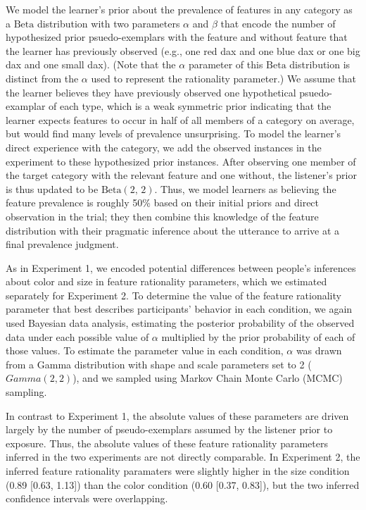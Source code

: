 \documentclass[
  english,
  man,floatsintext]{apa6}
\begin{document}
We model the learner's prior about the prevalence of features in any category as a \(\text{Beta}\) distribution with two parameters \(\alpha\) and \(\beta\) that encode the number of hypothesized prior psuedo-exemplars with the feature and without feature that the learner has previously observed (e.g., one red dax and one blue dax or one big dax and one small dax). (Note that the \(\alpha\) parameter of this \(\text{Beta}\) distribution is distinct from the \(\alpha\) used to represent the rationality parameter.) We assume that the learner believes they have previously observed one hypothetical psuedo-examplar of each type, which is a weak symmetric prior indicating that the learner expects features to occur in half of all members of a category on average, but would find many levels of prevalence unsurprising. To model the learner's direct experience with the category, we add the observed instances in the experiment to these hypothesized prior instances. After observing one member of the target category with the relevant feature and one without, the listener's prior is thus updated to be \(\text{Beta}\left(2,\,2\right)\). Thus, we model learners as believing the feature prevalence is roughly 50\% based on their initial priors and direct observation in the trial; they then combine this knowledge of the feature distribution with their pragmatic inference about the utterance to arrive at a final prevalence judgment.

As in Experiment 1, we encoded potential differences between people's inferences about color and size in feature rationality parameters, which we estimated separately for Experiment 2. To determine the value of the feature rationality parameter that best describes participants' behavior in each condition, we again used Bayesian data analysis, estimating the posterior probability of the observed data under each possible value of \(\alpha\) multiplied by the prior probability of each of those values. To estimate the parameter value in each condition, \(\alpha\) was drawn from a Gamma distribution with shape and scale parameters set to 2 (\(Gamma\left(2,2\right)\)), and we sampled using Markov Chain Monte Carlo (MCMC) sampling.

In contrast to Experiment 1, the absolute values of these parameters are driven largely by the number of pseudo-exemplars assumed by the listener prior to exposure. Thus, the absolute values of these feature rationality parameters inferred in the two experiments are not directly comparable. In Experiment 2, the inferred feature rationality paramaters were slightly higher in the size condition (0.89 {[}0.63, 1.13{]}) than the color condition (0.60 {[}0.37, 0.83{]}), but the two inferred confidence intervals were overlapping.
\end{document}
